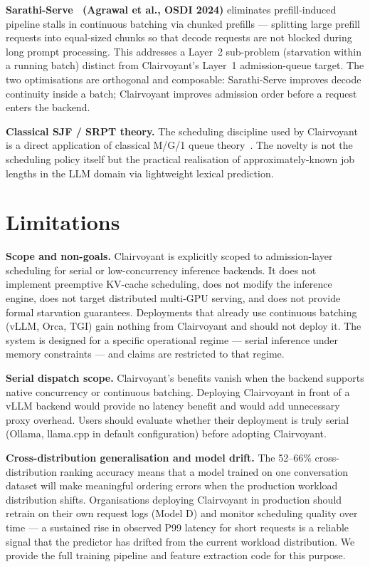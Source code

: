 \documentclass[10pt,letterpaper]{article}
\begin{document}
\textbf{Sarathi-Serve~\cite{agrawal2024sarathi} (Agrawal et al., OSDI 2024)} eliminates prefill-induced pipeline stalls in continuous batching via chunked prefills --- splitting large prefill requests into equal-sized chunks so that decode requests are not blocked during long prompt processing. This addresses a Layer~2 sub-problem (starvation within a running batch) distinct from Clairvoyant's Layer~1 admission-queue target. The two optimisations are orthogonal and composable: Sarathi-Serve improves decode continuity inside a batch; Clairvoyant improves admission order before a request enters the backend.

\textbf{Classical SJF / SRPT theory.} The scheduling discipline used by Clairvoyant is a direct application of classical M/G/1 queue theory~\cite{kleinrock1975}. The novelty is not the scheduling policy itself but the practical realisation of approximately-known job lengths in the LLM domain via lightweight lexical prediction.

\section{Limitations}
\label{sec:limitations}

\textbf{Scope and non-goals.} Clairvoyant is explicitly scoped to admission-layer scheduling for serial or low-concurrency inference backends. It does not implement preemptive KV-cache scheduling, does not modify the inference engine, does not target distributed multi-GPU serving, and does not provide formal starvation guarantees. Deployments that already use continuous batching (vLLM, Orca, TGI) gain nothing from Clairvoyant and should not deploy it. The system is designed for a specific operational regime --- serial inference under memory constraints --- and claims are restricted to that regime.

\textbf{Serial dispatch scope.} Clairvoyant's benefits vanish when the backend supports native concurrency or continuous batching. Deploying Clairvoyant in front of a vLLM backend would provide no latency benefit and would add unnecessary proxy overhead. Users should evaluate whether their deployment is truly serial (Ollama, llama.cpp in default configuration) before adopting Clairvoyant.

\textbf{Cross-distribution generalisation and model drift.} The 52--66\% cross-distribution ranking accuracy means that a model trained on one conversation dataset will make meaningful ordering errors when the production workload distribution shifts. Organisations deploying Clairvoyant in production should retrain on their own request logs (Model D) and monitor scheduling quality over time --- a sustained rise in observed P99 latency for short requests is a reliable signal that the predictor has drifted from the current workload distribution. We provide the full training pipeline and feature extraction code for this purpose.
\end{document}
